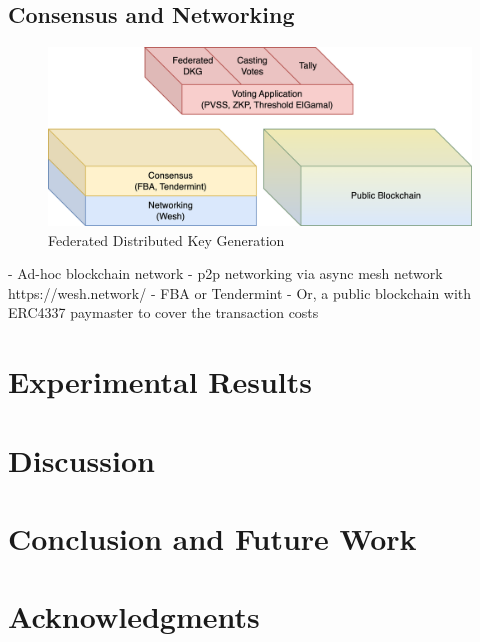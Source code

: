 \documentclass{article}
\begin{document}
\subsection{Consensus and Networking}

\begin{figure}
    \centering
    \includegraphics[width=\textwidth]{stack-bc.png}
    \caption{Federated Distributed Key Generation}
    \label{fig:FDKG}
\end{figure}

- Ad-hoc blockchain network
- p2p networking via async mesh network https://wesh.network/
- FBA or Tendermint
- Or, a public blockchain with ERC4337 paymaster to cover the transaction costs

\section{Experimental Results}

\section{Discussion}

\section{Conclusion and Future Work}

\section{Acknowledgments}




\end{document}
